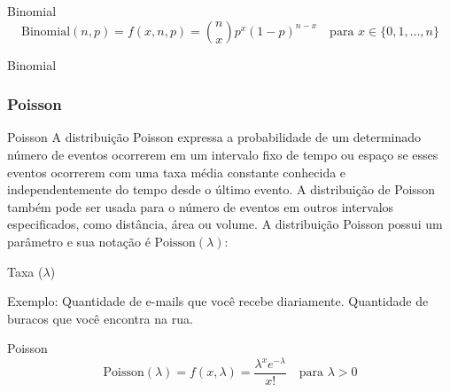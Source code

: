 \begin{frame}{Binomial}
	$$\text{Binomial}(n,p) = f(x, n, p) = \binom{n}{x}p^{x}(1-p)^{n-x} \quad \text{para $x \in \{0, 1, \dots, n\}$}$$
\end{frame}

\begin{frame}{Binomial}
	\centering
\end{frame}

\subsubsection{Poisson}
\begin{frame}{Poisson}
	A distribuição Poisson expressa a probabilidade de um determinado número de
	eventos ocorrerem em um intervalo fixo de tempo ou espaço se esses eventos
	ocorrerem com uma taxa média constante conhecida e independentemente do tempo
	desde o último evento. A distribuição de Poisson também pode ser usada
	para o número de eventos em outros intervalos especificados, como distância,
	área ou volume.
	\vfill
	A distribuição Poisson possui um parâmetro e sua notação é $\text{Poisson}(\lambda)$:
	\begin{vfilleditems}
		\item Taxa ($\lambda$)
	\end{vfilleditems}
	\vfill
	Exemplo: Quantidade de e-mails que você recebe diariamente. Quantidade de buracos que você encontra na rua.
\end{frame}

\begin{frame}{Poisson}
	$$\text{Poisson}(\lambda) = f(x, \lambda) = \frac{\lambda^x e^{-\lambda}}{x!} \quad \text{para $\lambda > 0$}$$
\end{frame}

